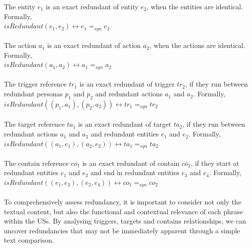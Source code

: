 \begin{definition}
	The entity $e_1$ is an exact redundant of entity $e_2$, when the entities are identical. Formally,\\
	$isRedundant(e_1,e_2) \leftrightarrow e_1 =_{syn} e_2$\\\\
	The action $a_1$ is an exact redundant of action $a_2$, when the actions are identical. Formally,\\
	$isRedundant(a_1,a_2) \leftrightarrow a_1 =_{syn} a_2$\\\\
	The trigger reference $tr_1$ is an exact redundant of trigger $tr_2$, if they run between redundant personas $p_1$ and $p_2$ and redundant actions $a_1$ and $a_2$. Formally,\\
	$isRedundant((p_1,a_1),(p_2,a_2)) \leftrightarrow tr_1 =_{syn} tr_2$\\\\
	The target reference $ta_1$ is an exact redundant of target $ta_2$, if they run between redundant actions $a_1$ and $a_2$ and redundant entities $e_1$ and $e_2$. Formally,\\
	$isRedundant((a_1,e_1),(a_2,e_2)) \leftrightarrow ta_1 =_{syn} ta_2$\\\\
	The contain reference $co_1$ is an exact redundant of contain $co_2$, if they start at redundant entities $e_1$ and $e_2$ and end in redundant entities $e_3$ and $e_4$. Formally,\\
	$isRedundant((e_1,e_3),(e_2,e_4)) \leftrightarrow co_1 =_{syn} co_2$\\\\
	To comprehensively assess redundancy, it is important to consider not only the textual content, but also the functional and contextual relevance of each phrase within the USs. By analysing triggers, targets and contains relationships, we can uncover redundancies that may not be immediately apparent through a simple text comparison.
\end{definition}	
